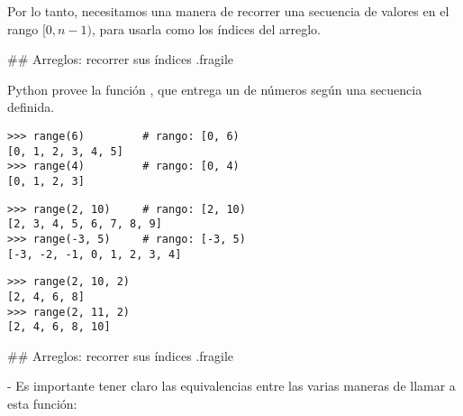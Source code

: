 \pause

\bgnblockidea
Por lo tanto, necesitamos una manera de recorrer una secuencia de valores en el rango $[0, n-1)$,
para usarla como los índices del arreglo.
\trmblockidea

## Arreglos: recorrer sus índices {.fragile}

\bgnblockdefinition
{} Python provee la función , que entrega
un  de números según una secuencia definida.
\trmblockdefinition

\bgncolumns[-2ex]


\begin{lstlisting}[style=frame03]
>>> range(6)         # rango: [0, 6)
[0, 1, 2, 3, 4, 5]
>>> range(4)         # rango: [0, 4)
[0, 1, 2, 3]
\end{lstlisting}



\begin{lstlisting}[style=frame03]
>>> range(2, 10)     # rango: [2, 10)
[2, 3, 4, 5, 6, 7, 8, 9]
>>> range(-3, 5)     # rango: [-3, 5)
[-3, -2, -1, 0, 1, 2, 3, 4]
\end{lstlisting}

\trmcolumns


\begin{lstlisting}[style=frame03]
>>> range(2, 10, 2)
[2, 4, 6, 8]
>>> range(2, 11, 2)
[2, 4, 6, 8, 10]
\end{lstlisting}

## Arreglos: recorrer sus índices {.fragile}


- Es importante tener claro las equivalencias entre las varias maneras de llamar a esta función:

\vfill

\bgnblockgood
{}
\bgncolumns[2ex]
\bgnblocknormal
{}
\trmblocknormal
{}
\bgnblocknormal
{}
\trmblocknormal
{}
\bgnblocknormal
{}
\trmblocknormal
{}
\trmcolumns
\trmblockgood
{}

